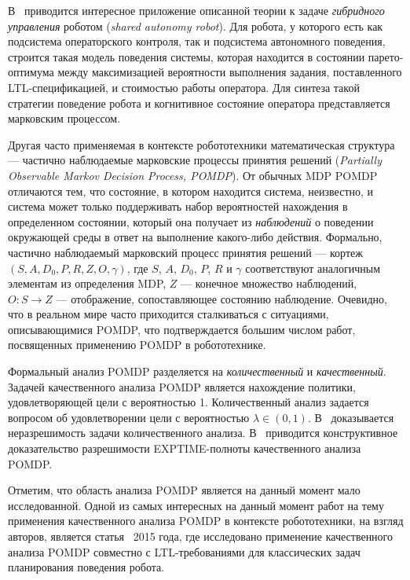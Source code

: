 \documentclass[conference]{IEEEtran}
\begin{document}
В~\cite{fu2014pareto} приводится интересное приложение описанной теории к задаче 
\textit{гибридного управления} роботом (\textit{shared autonomy robot}). Для 
робота, у которого есть как подсистема операторского контроля, так и подсистема 
автономного поведения, строится такая модель поведения системы, которая находится 
в состоянии парето-оптимума между максимизацией вероятности выполнения задания, 
поставленного LTL-спецификацией, и стоимостью работы оператора. Для синтеза 
такой стратегии поведение робота и когнитивное состояние оператора представляется 
марковским процессом.

Другая часто применяемая в контексте робототехники математическая структура --- 
частично наблюдаемые марковские процессы принятия решений 
(\textit{Partially Observable Markov Decision Process, POMDP}). От обычных MDP POMDP 
отличаются тем, что состояние, в котором находится система, неизвестно, и система 
может только поддерживать набор вероятностей нахождения в определенном состоянии, 
который она получает из \textit{наблюдений} о поведении окружающей среды в ответ на 
выполнение какого-либо действия. Формально, частично наблюдаемый марковский 
процесс принятия решений --- кортеж $(S, A, D_0, P, R, Z, O, \gamma)$, 
где $S$, $A$, $D_0$, $P$, $R$ и $\gamma$ соответствуют аналогичным элементам 
из определения MDP, $Z$ --- конечное множество наблюдений, $O: S\rightarrow{}Z$ 
--- отображение, сопоставляющее состоянию наблюдение. Очевидно, что в реальном 
мире часто приходится сталкиваться с ситуациями, описывающимися POMDP, что 
подтверждается большим числом работ, посвященных применению POMDP в робототехнике.

Формальный анализ POMDP разделяется на \textit{количественный} и \textit{качественный}. 
Задачей качественного анализа POMDP является нахождение политики, удовлетворяющей 
цели с вероятностью 1. Количественный анализ задается вопросом об удовлетворении 
цели с вероятностью $\lambda \in (0,1)$. В~\cite{baier2012probabilistic} доказывается 
неразрешимость задачи количественного анализа. В~\cite{chatterjee2013decidable} 
приводится конструктивное доказательство разрешимости EXPTIME-полноты качественного 
анализа POMDP.

Отметим, что область анализа POMDP является на данный момент мало исследованной. 
Одной из самых интересных на данный момент работ на тему применения 
качественного анализа POMDP в контексте робототехники, на взгляд авторов, 
является статья~\cite{chatterjee2014qualitative} 2015 года, где исследовано 
применение качественного анализа POMDP совместно с LTL-требованиями для 
классических задач планирования поведения робота.
\end{document}
